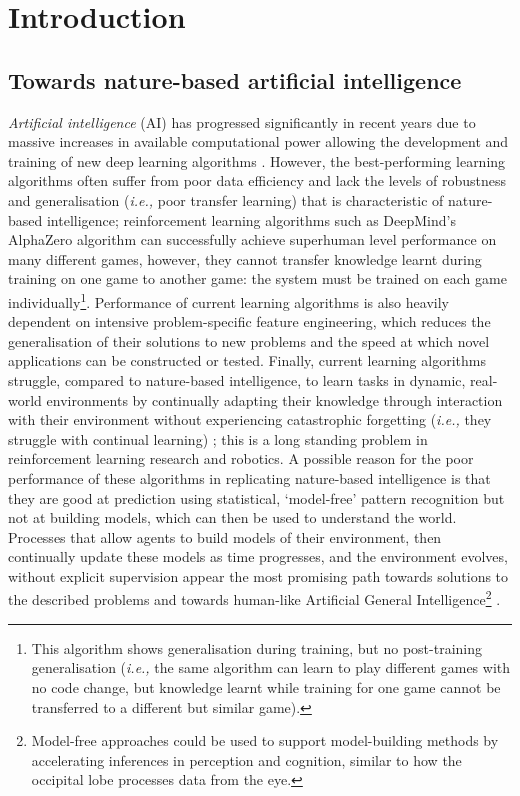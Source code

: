 \chapter{
Introduction 
}\label{chp:Introduction}
\section{Towards nature-based artificial intelligence}

\textit{Artificial intelligence} (AI) has progressed significantly in recent years due to massive increases in available computational power allowing the development and training of new deep learning algorithms \autocite{amodei2018ai}.
However, the best-performing learning algorithms often suffer from poor data efficiency and lack the levels of robustness and generalisation (\textit{i.e.,} poor transfer learning) that is characteristic of nature-based intelligence; reinforcement learning algorithms such as DeepMind’s AlphaZero algorithm \autocite{Silver2017a, Silver2017b} can successfully achieve superhuman level performance on many different games, however, they cannot transfer knowledge learnt during training on one game to another game: the system must be trained on each game individually\footnote{This algorithm shows generalisation during training, but no post-training generalisation (\textit{i.e.,} the same algorithm can learn to play different games with no code change, but knowledge learnt while training for one game cannot be transferred to a different but similar game).}.
Performance of current learning algorithms is also heavily dependent on intensive problem-specific feature engineering, which reduces the generalisation of their solutions to new problems and the speed at which novel applications can be constructed or tested.
Finally, current learning algorithms struggle, compared to nature-based intelligence, to learn tasks in dynamic, real-world environments by continually adapting their knowledge through interaction with their environment without experiencing catastrophic forgetting (\textit{i.e.,} they struggle with continual learning) \autocite{Sauders2018}; this is a long standing problem in reinforcement learning research and robotics.
A possible reason for the poor performance of these algorithms in replicating nature-based intelligence is that they are good at prediction using statistical, ‘model-free’ pattern recognition but not at building models, which can then be used to understand the world.
Processes that allow agents to build models of their environment, then continually update these models as time progresses, and the environment evolves, without explicit supervision appear the most promising path towards solutions to the described problems and towards human-like Artificial General Intelligence\footnote{Model-free approaches could be used to support model-building methods by accelerating inferences in perception and cognition, similar to how the occipital lobe processes data from the eye.} \autocite{Lake2017, Bengio2013}.

